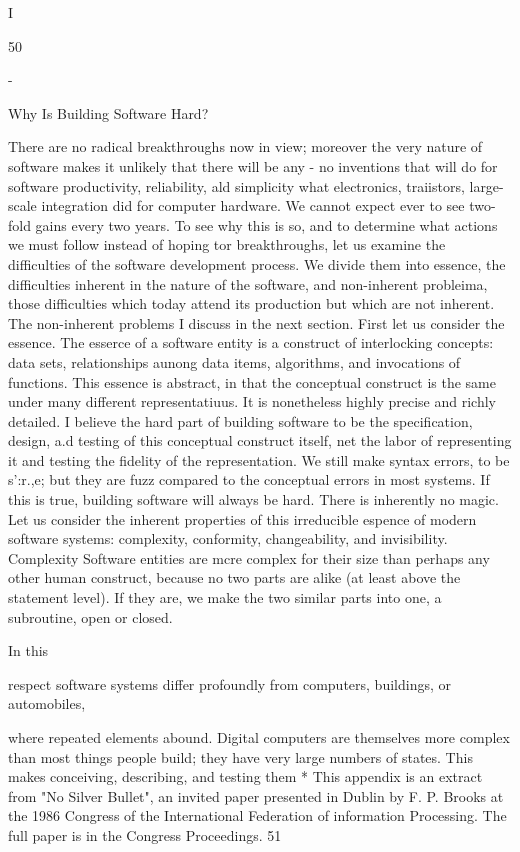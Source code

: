 \documentclass[12pt]{article}
\begin{document}
I

50


-

Why Is Building Software Hard?

There are no radical breakthroughs now in view; moreover the very nature of software
makes it unlikely that there will be any - no inventions that will do for software
productivity, reliability, ald simplicity what electronics, traiistors, large-scale integration
did for computer hardware. We cannot expect ever to see two-fold gains every two years.
To see why this is so, and to determine what actions we must follow instead of hoping
tor breakthroughs, let us examine the difficulties of the software development process.
We divide them into essence, the difficulties inherent in the nature of the software, and
non-inherent probleima, those difficulties which today attend its production but which are
not inherent.
The non-inherent problems I discuss in the next section. First let us consider the
essence.
The esserce of a software entity is a construct of interlocking concepts: data sets,
relationships aunong data items, algorithms, and invocations of functions. This essence is
abstract, in that the conceptual construct is the same under many different representatiuus.
It is nonetheless highly precise and richly detailed.
I believe the hard part of building software to be the specification, design, a.d testing
of this conceptual construct itself, net the labor of representing it and testing the fidelity
of the representation. We still make syntax errors, to be s':r.,e; but they are fuzz compared
to the conceptual errors in most systems.
If this is true, building software will always be hard. There is inherently no magic.
Let us consider the inherent properties of this irreducible espence of modern software
systems: complexity, conformity, changeability, and invisibility.
Complexity
Software entities are mcre complex for their size than perhaps any other human
construct, because no two parts are alike (at least above the statement level). If they
are, we make the two similar parts into one, a subroutine, open or closed.

In this

respect software systems differ profoundly from computers, buildings, or automobiles,

where repeated elements abound.
Digital computers are themselves more complex than most things people build; they
have very large numbers of states. This makes conceiving, describing, and testing them
* This appendix is an extract from "No Silver Bullet", an invited paper presented in
Dublin by F. P. Brooks at the 1986 Congress of the International Federation of information
Processing. The full paper is in the Congress Proceedings.
51
\end{document}
